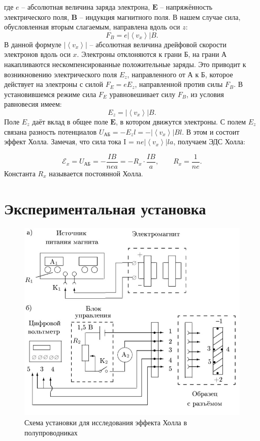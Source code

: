 где $ e $ -- абсолютная величина заряда электрона, $ \bm{E} $ -- напряжённость электрического поля, $ \bm{B} $ -- индукция магнитного поля. В нашем случае сила, обусловленная вторым слагаемым, направлена вдоль оси $ z $:
\[ F_B = e |\left\langle v_x \right\rangle| B. \]
\n
В данной формуле $ |\left\langle v_x \right\rangle| $ -- абсолютная величина дрейфовой скорости электронов вдоль оси $ x $. Электроны отклоняются к грани Б, на грани А накапливаются нескомпенсированные положительные заряды. Это приводит к возникновению электрического поля $ E_z $, направленного от А к Б, которое действует на электроны с силой $ F_E=eE_z $, направленной против силы $ F_B $. В установившемся режиме сила $ F_E $ уравновешивает силу $ F_B $, из условия равновесия имеем:
\[ E_z = |\left\langle v_x \right\rangle| B. \]
\n
Поле $ E_z $ даёт вклад в общее поле $ \bm{E} $, в котором движутся электроны. С полем $ E_z $ связана разность потенциалов $ U_\text{АБ} = -E_z l = - |\left\langle v_x \right\rangle| B l.$ В этом и состоит эффект Холла. Замечая, что сила тока  I = $n e |\left\langle v_x \right\rangle| l a $, получаем ЭДС Холла:

\begin{equation}\label{1}
\mathcal{E}_x = U_\text{АБ}= - \frac{IB}{nea} = - R_x \cdot \frac{IB}{a}, \qquad R_x=\frac{1}{ne}.
\end{equation}
\n
Константа $ R_x $ называется постоянной Холла.

\section*{Экспериментальная установка}

\begin{figure}[h]
	\centering
	\includegraphics[width=15cm]{ust.jpg}
	\caption{Схема установки для исследования эффекта Холла	в полупроводниках}
	\label{ust}
\end{figure}

